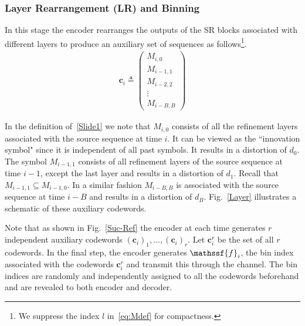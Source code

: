 \documentclass[journal, twocolumn, 10pt]{IEEEtran}
\newcommand{\defeq}{\stackrel{\Delta}{=}}
\newcommand{\bc}{{\mathbf{c}}}
\newcommand{\cM}{{\mathcal{M}}}
\renewcommand{\defeq}{\triangleq}
\newcommand{\rvf}{{\mathssf{f}}}    %
\begin{document}
{\subsubsection{Layer Rearrangement (LR) and Binning}
\label{subsec:lr}
In this stage the encoder rearranges the outputs of the SR blocks associated with different layers to produce an auxiliary set of sequences as follows\footnote{We suppress the index $l$ in~\eqref{eq:Mdef} for compactness.}.
\begin{align}
{\bc}_{i}\defeq\!
\begin{pmatrix}
{M_{i,0}}\\
{M_{i-1,1}}\\
{M_{i-2,2}}\\
\vdots\\
{M_{i-B,B}}
\end{pmatrix} \label{Slide1}
\end{align}

In the definition of~\eqref{Slide1} we note that $M_{i,0}$ consists of all the refinement layers associated with the source sequence at time $i$. It can be viewed as the ``innovation symbol" since it is independent of all past  symbols. It results in a distortion of $d_0$. The symbol $M_{i-1,1}$ consists of all refinement layers of the source sequence at time $i-1$, except the last layer and results in a distortion of $d_1$.  Recall that $M_{i-1,1} \subseteq M_{i-1,0}$. In a similar fashion $M_{i-B,B}$ is associated with the source sequence at time $i-B$ and results in a distortion of $d_B$.  Fig.~\ref{Layer} illustrates a schematic of these auxiliary codewords.



Note that as shown in  Fig.~\ref{Suc-Ref} the encoder at each time generates $r$ independent auxiliary codewords $(\bc_{i})_1,\ldots, (\bc_i)_r$.  Let $\bc_{i}^r$ be the set of all $r$ codewords.  In the final step, the encoder generates $\rvf_{i}$, the bin index associated with the codewords $\bc^r_{i}$ and transmit this through the channel. The bin indices are randomly and independently assigned to all the codewords beforehand and are revealed to both encoder and decoder. 

\begin{figure}
\vspace{1em}
\begin{center}
\end{center}
\end{figure}}
\end{document}
